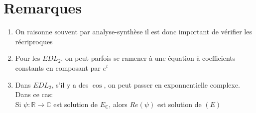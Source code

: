 \documentclass[fleqn]{article}
\theoremstyle{definition} \newtheorem*{defi}{D\'efinition}
\theoremstyle{definition} \newtheorem*{theo}{Th\'eor\`eme}
\theoremstyle{remark} \newtheorem*{rqs}{Remarques}
\begin{document}
\section{Remarques}
\begin{enumerate}
	\item On raisonne souvent par analyse-synth\`ese il est donc important de v\'erifier les r\'ecriproques
	\item Pour les $EDL_2$, on peut parfois se ramener \`a une \'equation \`a coefficients constants en composant par $e^t$
	\item Dans $EDL_2$, s'il y a des $\cos$, on peut passer en exponnentielle complexe. Dans ce cas: \\
		Si $\psi: \mathbb{R} \rightarrow \mathbb{C}$ est solution de $E_\mathbb{C}$, alors $Re(\psi)$ est solution de $(E)$
\end{enumerate}
\end{document}
